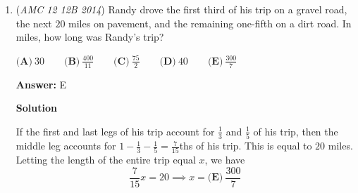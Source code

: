 \begin{enumerate}
 
Substitute in $b\leq{18}$.

 $Q\leq{30+\frac{b}{3}}\leq{30+\frac{18}{3}}=36$

 
The maximum value of $Q$ is indeed attainable. Buying $18$ balloons at the original price and $18$ balloons at the discounted price, Orvin will spend $18k+18\times{\frac{2}{3}}k=30k$ dollars. This completes the proof.

 
The answer to the problem is $36$.

 


 



\textbf{Solution 2}

If every balloon costs $n$ dollars, then Orvin has $30n$ dollars.  For every balloon he buys for $n$ dollars, he can buy another for $\frac{2n}{3}$ dollars.  This means it costs him $\frac{5n}{3}$ dollars to buy a bundle of $2$ balloons.  With $30n$ dollars, he can buy $\frac{30n}{\frac{5n}{3}} = 18$ sets of two balloons, so the total number of balloons he can buy is $18\times2  \implies \boxed{\textbf{(C)}\ 36 }$




\textbf{Solution 3}

Similar to solution 1, but quicker. We see the fraction $\frac13,$ so we let each balloon cost $\$3$ WLOG. Thus, Orvin has $\$3\cdot30=\$90.$ Each pair of balloons (one full-priced and one a third off) costs $\$3+\left(1-\frac13\right)\cdot\$3=\$3+\$2=\$5.$ Therefore, Orvin can buy $\frac{\$90}{\$5}=18$ pairs of balloons, at maximum. $18\cdot2=36$ balloons. ~Technodoggo

 


 


	\item (\textit{AMC 12 12B 2014}) Randy drove the first third of his trip on a gravel road, the next $20$ miles on pavement, and the remaining one-fifth on a dirt road. In miles, how long was Randy's trip?


 $\textbf{(A)}\ 30\qquad\textbf{(B)}\ \frac{400}{11}\qquad\textbf{(C)}\ \frac{75}{2}\qquad\textbf{(D)}\ 40\qquad\textbf{(E)}\ \frac{300}{7}$

 \textbf{Answer: }E



\textbf{Solution}

If the first and last legs of his trip account for $\frac{1}{3}$ and $\frac{1}{5}$ of his trip, then the middle leg accounts for $1 - \frac{1}{3} - \frac{1}{5} = \frac{7}{15}$ths of his trip.  This is equal to $20$ miles.  Letting the length of the entire trip equal $x$, we have 
 \[\frac{7}{15}x = 20 \implies x=\boxed{\textbf{(E)}\ \frac{300}{7}}\]




\end{enumerate}
